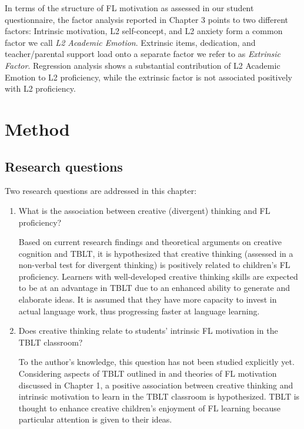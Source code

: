 \documentclass[output=paper]{langsci/langscibook}
\begin{document}
In terms of the structure of FL motivation as assessed in our student questionnaire, the factor analysis reported in Chapter 3 points to two different factors: Intrinsic motivation, L2 self-concept, and L2 anxiety form a common factor we call \textit{L2 Academic Emotion}. Extrinsic items, dedication, and teacher/parental support load onto a separate factor we refer to as \textit{Extrinsic Factor}. Regression analysis shows a substantial contribution of L2 Academic Emotion to L2 proficiency, while the extrinsic factor is not associated positively with L2 proficiency.

\section{Method}
\subsection{Research questions}

Two research questions are addressed in this chapter:

\begin{enumerate} 

\item What is the association between creative (divergent) thinking and FL proficiency? 

Based on current research findings and theoretical arguments on creative cognition and TBLT, it is hypothesized that creative thinking (assessed in a non-verbal test for divergent thinking) is positively related to children’s FL proficiency. Learners with well-developed creative thinking skills are expected to be at an advantage in TBLT due to an enhanced ability to generate and elaborate ideas. It is assumed that they have more capacity to invest in actual language work, thus progressing faster at language learning.

\item Does creative thinking relate to students’ intrinsic FL motivation in the TBLT classroom? 

To the author’s knowledge, this question has not been studied explicitly yet. Considering aspects of TBLT outlined in  and theories of FL motivation discussed in Chapter 1, a positive association between creative thinking and intrinsic motivation to learn in the TBLT classroom is hypothesized. TBLT is thought to enhance creative children’s enjoyment of FL learning because particular attention is given to their ideas. 
\end{enumerate}
\end{document}
